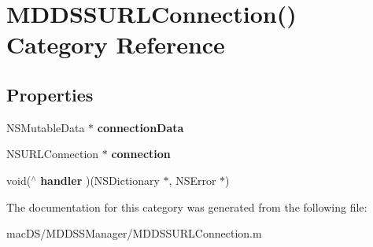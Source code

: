 \hypertarget{category_m_d_d_s_s_u_r_l_connection_07_08}{\section{M\-D\-D\-S\-S\-U\-R\-L\-Connection() Category Reference}
\label{category_m_d_d_s_s_u_r_l_connection_07_08}
}
\subsection*{Properties}
\begin{DoxyCompactItemize}
\item 
\hypertarget{category_m_d_d_s_s_u_r_l_connection_07_08_a1b8edfb5e67abb0c0149d32fff6de125}{N\-S\-Mutable\-Data $\ast$ {\bfseries connection\-Data}}\label{category_m_d_d_s_s_u_r_l_connection_07_08_a1b8edfb5e67abb0c0149d32fff6de125}

\item 
\hypertarget{category_m_d_d_s_s_u_r_l_connection_07_08_ae55a35d62eea24f907dca1119e857470}{N\-S\-U\-R\-L\-Connection $\ast$ {\bfseries connection}}\label{category_m_d_d_s_s_u_r_l_connection_07_08_ae55a35d62eea24f907dca1119e857470}

\item 
\hypertarget{category_m_d_d_s_s_u_r_l_connection_07_08_ac0730026e02824415467fa0e1d7c8e05}{void($^\wedge$ {\bfseries handler} )(N\-S\-Dictionary $\ast$, N\-S\-Error $\ast$)}\label{category_m_d_d_s_s_u_r_l_connection_07_08_ac0730026e02824415467fa0e1d7c8e05}

\end{DoxyCompactItemize}


The documentation for this category was generated from the following file\-:\begin{DoxyCompactItemize}
\item 
mac\-D\-S/\-M\-D\-D\-S\-S\-Manager/M\-D\-D\-S\-S\-U\-R\-L\-Connection.\-m\end{DoxyCompactItemize}
